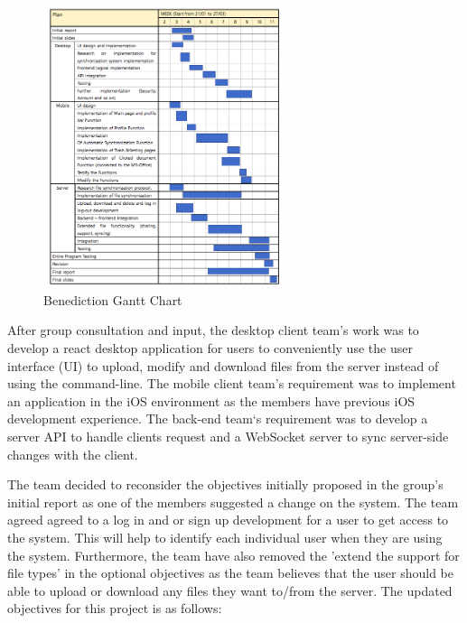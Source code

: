 \documentclass{article}
\begin{document}
\begin{figure}[H]
\begin{center}
\includegraphics[width=7cm]{timetable.png}
\end{center}
\caption{Benediction Gantt Chart}\label{ex4}
\end{figure}

After group consultation and input, the desktop client team’s work was to develop a react desktop application for users to conveniently use the user interface (UI) to upload, modify and download files from the server instead of using the command-line. 
The mobile client team’s requirement was to implement an application in the iOS environment as the members have previous iOS development experience. The back-end team‘s requirement was to develop a server API to handle clients request and a WebSocket server to sync server-side changes with the client. \newline

The team decided to reconsider the objectives initially proposed in the group's initial report as one of the members suggested a change on the system. The team agreed agreed to a log in and or sign up development for a user to get access to the system. This will help to identify each individual user when they are using the system. Furthermore, the team have also removed the 'extend the support for file types' in the optional objectives as the team believes that the user should be able to upload or download any files they want to/from the server.
The updated objectives for this project is as follows:
\end{document}
